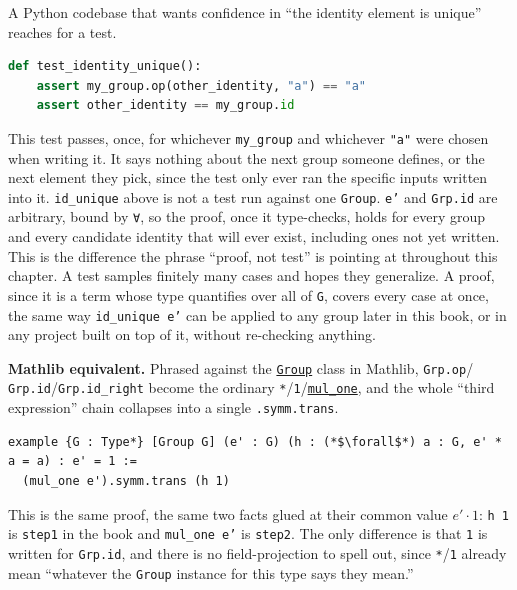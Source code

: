 \begin{progcorner}

A Python codebase that wants confidence in ``the identity element is unique'' reaches for a test.

\end{progcorner}

\begin{lstlisting}[language=Python,style=python]
def test_identity_unique():
    assert my_group.op(other_identity, "a") == "a"
    assert other_identity == my_group.id
\end{lstlisting}

This test passes, once, for whichever \texttt{my\_\allowbreak{}group} and whichever \texttt{"a"} were chosen when writing it. It says nothing about the next group someone defines, or the next element they pick, since the test only ever ran the specific inputs written into it. \texttt{id\_\allowbreak{}unique} above is not a test run against one \texttt{Group}. \texttt{e'} and \texttt{Grp.id} are arbitrary, bound by \texttt{∀}, so the proof, once it type-checks, holds for every group and every candidate identity that will ever exist, including ones not yet written. This is the difference the phrase ``proof, not test'' is pointing at throughout this chapter. A test samples finitely many cases and hopes they generalize. A proof, since it is a term whose type quantifies over all of \texttt{G}, covers every case at once, the same way \texttt{id\_\allowbreak{}unique e'} can be applied to any group later in this book, or in any project built on top of it, without re-checking anything.

\textbf{Mathlib equivalent.} Phrased against the \href{https://loogle.lean-lang.org/?q=Group}{\texttt{Group}} class in Mathlib, \texttt{Grp.op}/ \texttt{Grp.id}/\texttt{Grp.id\_\allowbreak{}right} become the ordinary \texttt{*}/\texttt{1}/\href{https://loogle.lean-lang.org/?q=mul_one}{\texttt{mul\_\allowbreak{}one}}, and the whole ``third expression'' chain collapses into a single \texttt{.symm.trans}.

\begin{lstlisting}
example {G : Type*} [Group G] (e' : G) (h : (*$\forall$*) a : G, e' * a = a) : e' = 1 :=
  (mul_one e').symm.trans (h 1)
\end{lstlisting}

This is the same proof, the same two facts glued at their common value \(e'\cdot 1\): \texttt{h 1} is \texttt{step1} in the book and \texttt{mul\_\allowbreak{}one e'} is \texttt{step2}. The only difference is that \texttt{1} is written for \texttt{Grp.id}, and there is no field-projection to spell out, since \texttt{*}/\texttt{1} already mean ``whatever the \texttt{Group} instance for this type says they mean.''

